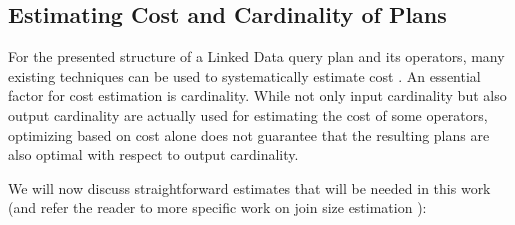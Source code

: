 \subsection{Estimating Cost and Cardinality of Plans}
\label{sec:estimation}
For the presented structure of a Linked Data query plan and its operators, many existing techniques can be used to systematically estimate cost \cite{stocker_sparql_2008,neumann_scalable_2009,huang_selectivity_2010}. An essential factor for cost estimation is cardinality. While not only input cardinality but also output cardinality are actually used for estimating the cost of some operators, optimizing based on cost alone does not guarantee that the resulting plans are also optimal with respect to output cardinality. 

We will now discuss straightforward estimates that will be needed in
this work (and refer the reader to more specific work on join size
estimation %
\cite{stocker_sparql_2008,neumann_scalable_2009,huang_selectivity_2010}):


